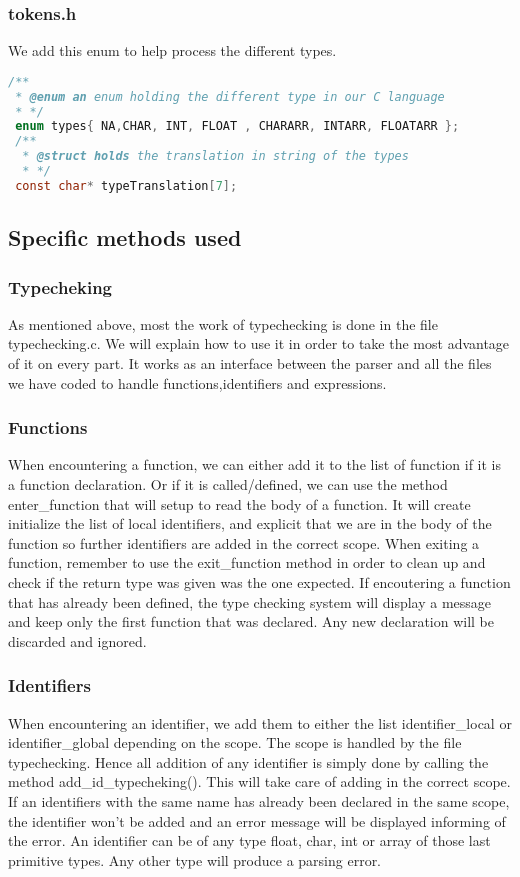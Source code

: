 \documentclass{article}
\begin{document}
\subsubsection{tokens.h}
We add this enum to help process the different types. 
\begin{lstlisting}[language=C]
/**
 * @enum an enum holding the different type in our C language
 * */
 enum types{ NA,CHAR, INT, FLOAT , CHARARR, INTARR, FLOATARR };
 /**
  * @struct holds the translation in string of the types
  * */
 const char* typeTranslation[7];	

\end{lstlisting}

\subsection{Specific methods used}
\subsubsection{Typecheking}
As mentioned above, most the work of typechecking is done in the file typechecking.c. 
We will explain how to use it in order to take the most advantage of it on every part.  It works as an interface between the parser and all the files we have coded to handle functions,identifiers and expressions. 
\subsubsection{Functions}
When encountering a function, we can either add it to the list of function if it is a function declaration. Or if it is called/defined, we can use the method enter\_function that will setup to read the body of a function. It will create initialize the list of local identifiers, and explicit that we are in the body of the function so further identifiers are added in the correct scope. 
When exiting a function, remember to use the exit\_function method in order to clean up and check if the return type was given was the one expected. If encoutering a function that has already been defined, the type checking system will display a message and keep only the first function that was declared. Any new declaration will be discarded and ignored. 
\subsubsection{Identifiers}
When encountering an identifier, we add them to either the list identifier\_local or identifier\_global depending on the scope. The scope is handled by the file typechecking. Hence all addition of any identifier is simply done by calling the method add\_id\_typecheking(). This will take care of adding in the correct scope. If an identifiers with the same name has already been declared in the same scope, the identifier won't be added and an error message will be displayed informing of the error. An identifier can be of any type float, char, int or array of those last primitive types. Any other type will produce a parsing error. 
\end{document}
